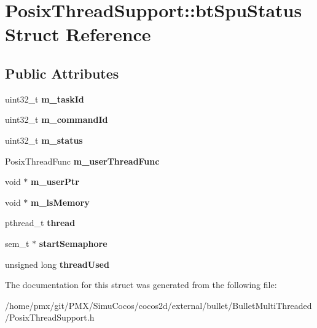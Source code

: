 \hypertarget{structPosixThreadSupport_1_1btSpuStatus}{}\section{Posix\+Thread\+Support\+:\+:bt\+Spu\+Status Struct Reference}
\label{structPosixThreadSupport_1_1btSpuStatus}
\subsection*{Public Attributes}
\begin{DoxyCompactItemize}
\item 
\mbox{\label{structPosixThreadSupport_1_1btSpuStatus_a86bb8befcdfb57908e927af77367a584}} 
uint32\+\_\+t {\bfseries m\+\_\+task\+Id}
\item 
\mbox{\label{structPosixThreadSupport_1_1btSpuStatus_a9b072032baa92a1560730a3da1020b4d}} 
uint32\+\_\+t {\bfseries m\+\_\+command\+Id}
\item 
\mbox{\label{structPosixThreadSupport_1_1btSpuStatus_a11417ac9de8d4365999a9b8bf857aa7b}} 
uint32\+\_\+t {\bfseries m\+\_\+status}
\item 
\mbox{\label{structPosixThreadSupport_1_1btSpuStatus_a704dcec15daec0db5847fab4f7908685}} 
Posix\+Thread\+Func {\bfseries m\+\_\+user\+Thread\+Func}
\item 
\mbox{\label{structPosixThreadSupport_1_1btSpuStatus_a86e5b74f83d609841fa452a33281fb0b}} 
void $\ast$ {\bfseries m\+\_\+user\+Ptr}
\item 
\mbox{\label{structPosixThreadSupport_1_1btSpuStatus_aa5ee689c269f03968d0e96ce6ac9eded}} 
void $\ast$ {\bfseries m\+\_\+ls\+Memory}
\item 
\mbox{\label{structPosixThreadSupport_1_1btSpuStatus_ac35bd0f2e2b1e5302c6fe2cb3b683419}} 
pthread\+\_\+t {\bfseries thread}
\item 
\mbox{\label{structPosixThreadSupport_1_1btSpuStatus_a6204cbceebb524f48abcab458b6244a0}} 
sem\+\_\+t $\ast$ {\bfseries start\+Semaphore}
\item 
\mbox{\label{structPosixThreadSupport_1_1btSpuStatus_ad35a430623350968c39e4b80038ae67a}} 
unsigned long {\bfseries thread\+Used}
\end{DoxyCompactItemize}


The documentation for this struct was generated from the following file\+:\begin{DoxyCompactItemize}
\item 
/home/pmx/git/\+P\+M\+X/\+Simu\+Cocos/cocos2d/external/bullet/\+Bullet\+Multi\+Threaded/Posix\+Thread\+Support.\+h\end{DoxyCompactItemize}
